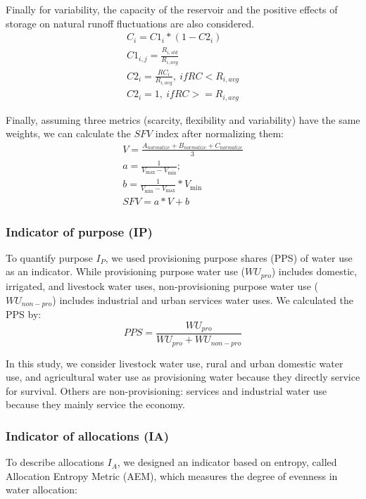 \documentclass[draft]{../agujournal2019}
\begin{document}
	Finally for variability, the capacity of the reservoir and the positive effects of storage on natural runoff fluctuations are also considered.
	\begin{gather}
	C_i = C1_i * (1 - C2_i) \\
	C1_{i, j} = \frac{R_{i, std}}{R_{i, avg}} \\
	C2_{i} = \frac{RC_{i}}{R_{i, avg}}, \ if RC < R_{i, avg} \\
	C2_{i} = 1, \ if RC >= R_{i, avg}
	\end{gather}

	Finally, assuming three metrics (scarcity, flexibility and variability) have the same weights, we can calculate the $SFV$ index after normalizing them:
	\begin{gather}
		V = \frac{A_{normalize} + B_{normalize} + C_{normalize}}{3}\\
		a = \frac{1}{V_{\max} - V_{\min}};\\
		b = \frac{1}{V_{\min} - V_{\max}} * V_{\min}\\
		SFV = a * V + b
	\end{gather}

	\subsubsection{Indicator of purpose (IP)}
	To quantify purpose $I_P$, we used provisioning purpose shares (PPS) of water use as an indicator. While provisioning purpose water use ($WU_{pro}$) includes domestic, irrigated, and livestock water uses, non-provisioning purpose water use ($WU_{non-pro}$) includes industrial and urban services water uses. We calculated the PPS by:
	\begin{equation}
		PPS = \frac{WU_{pro}}{WU_{pro} + WU_{non-pro}}
	\end{equation}

	In this study, we consider livestock water use, rural and urban domestic water use, and agricultural water use as provisioning water because they directly service for survival. Others are non-provisioning: services and industrial water use because they mainly service the economy.

	\subsubsection{Indicator of allocations (IA)}
	To describe allocations $I_A$, we designed an indicator based on entropy, called Allocation Entropy Metric (AEM), which measures the degree of evenness in water allocation:
\end{document}

